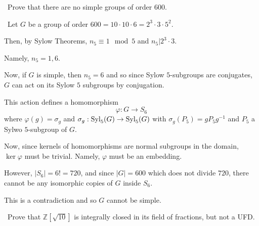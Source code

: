 \documentclass[12pt]{Qual}
\begin{document}
\begin{problem} $\,$
Prove that there are no simple groups of order $600.$
\end{problem}


\begin{solution}$\,$
Let $G$ be a group of order $600=10\cdot 10\cdot 6=2^3\cdot 3\cdot 5^2$.

Then, by Sylow Theorems, $n_5\equiv 1\mod5$ and $n_5|2^3\cdot 3$.

Namely, $n_5=1,6$.

Now, if $G$ is simple, then $n_5=6$ and so since Sylow $5$-subgroups are conjugates, $G$ can act on its Sylow $5$ subgroups by conjugation.

This action defines a homomorphism $$\varphi:G\to S_6$$ where $\varphi(g)=\sigma_g$ and $\sigma_g:\text{Syl}_5(G)\to\text{Syl}_5(G)$ with $\sigma_g(P_5)=gP_5g^{-1}$ and $P_5$ a Sylwo $5$-subgroup of $G$.

Now, since kernels of homomorphisms are normal subgroups in the domain, $\ker\varphi$ must be trivial. Namely, $\varphi$ must be an embedding.

However, $|S_6|=6!=720$, and since $|G|=600$ which does not divide $720$, there cannot be any isomorphic copies of $G$ inside $S_6$.

This is a contradiction and so $G$ cannot be simple.
\end{solution}
\newpage



\begin{problem} $\,$
Prove that $\mathbb{Z}[\sqrt{10}]$ is integrally closed in its field of fractions, but not a UFD.
\end{problem}
\end{document}
